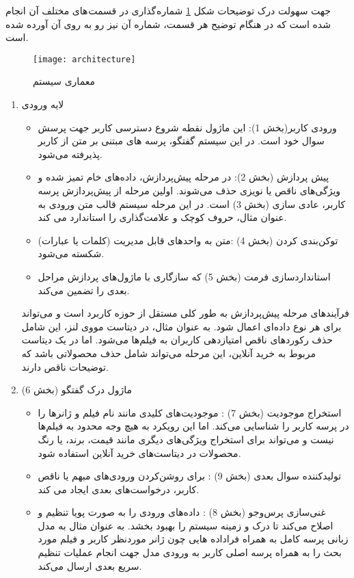 جهت سهولت درک توضیحات شکل%
\ref{fig:architecture}
شماره گذاری در قسمت های مختلف آن انجام شده است که در هنگام توضیح هر قسمت، شماره آن نیز رو به روی آن آورده شده است.


\begin{figure}[ht]
	\centerline{\texttt{[image: architecture]}}
	\caption{معماری سیستم}
	\label{fig:architecture}
\end{figure}


\begin{enumerate}
\item
 لایه ورودی
\begin{itemize}
\item
ورودی کاربر(بخش 1): این ماژول نقطه شروع دسترسی کاربر جهت پرسش سوال خود است. در این سیستم گفتگو، پرسه های مبتنی بر متن از کاربر پذیرفته می‌شود.
\item
پیش پردازش (بخش 2):
در مرحله پیش‌پردازش، داده‌های خام تمیز شده و ویژگی‌های ناقص یا نویزی حذف می‌شوند. اولین مرحله از پیش‌پردازش پرسه کاربر، 
عادی سازی%
  (بخش 3) است. در این مرحله سیستم قالب متن ورودی به عنوان مثال، حروف کوچک و علامت‌گذاری را استاندارد می کند.
\item
توکن‌بندی کردن%
 (بخش 4) :متن به واحدهای قابل مدیریت (کلمات یا عبارات) شکسته می‌شود.
\item
استاندارد‌سازی فرمت%
 (بخش 5) که سازگاری با ماژول‌های پردازش مراحل بعدی را تضمین می‌کند.
\end{itemize}

فرآیندهای مرحله پیش‌پردازش به طور کلی مستقل از حوزه کاربرد است و می‌تواند برای هر نوع داده‌ای اعمال شود. به عنوان مثال، در دیتاست مووی لنز، این شامل حذف رکوردهای ناقص امتیازدهی کاربران به فیلم‌ها می‌شود. اما در یک دیتاست مربوط به خرید آنلاین، این مرحله می‌تواند شامل حذف محصولاتی باشد که توضیحات ناقص دارند.
\item
 ماژول درک گفتگو (بخش 6)
\begin{itemize}
\item
استخراج موجودیت%
 (بخش 7) : موجودیت‌های کلیدی مانند نام فیلم و ژانرها را در پرسه کاربر را شناسایی می‌کند. اما این رویکرد به هیچ وجه محدود به فیلم‌ها نیست و می‌تواند برای استخراج ویژگی‌های دیگری مانند قیمت، برند، یا رنگ محصولات در دیتاست‌های خرید آنلاین استفاده شود.
\item
تولید‌کننده سوال بعدی%
 (بخش 9) : برای روشن‌کردن ورودی‌های مبهم یا ناقص کاربر، درخواست‌های بعدی ایجاد می کند.
\item
غنی‌سازی پرس‌وجو%
 (بخش 8) : داده‌های ورودی را به صورت پویا تنظیم و اصلاح می‌کند تا درک و زمینه سیستم را بهبود بخشد. به عنوان مثال به مدل زبانی پرسه کامل به همراه فراداده هایی چون ژانر موردنظر کاربر و فیلم مورد بحث را به همراه پرسه اصلی کاربر به ورودی مدل جهت انجام عملیات تنظیم سریع بعدی ارسال می‌کند.
\end{itemize}


\end{enumerate}
